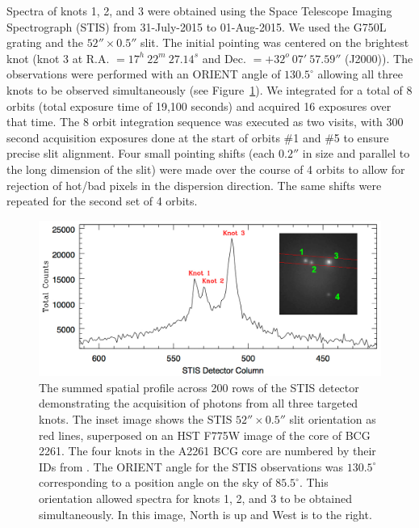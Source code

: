 \documentclass[useAMS,usenatbib]{emulateapj}
\newcommand{\src}{BCG\,2261}
\begin{document}
Spectra of knots 1, 2, and 3 were obtained using the Space Telescope Imaging Spectrograph (STIS) from 31-July-2015 to 01-Aug-2015. We used the G750L grating and the $52'' \times 0.5''$ slit. The initial pointing was centered on the brightest knot (knot 3 at R.A. $=17^h\ 22^m\ 27.14^s$ and Dec. $=+32^o\ 07'\ 57.59''$ (J2000)). The observations were performed with an ORIENT angle of $130.5^{\circ}$ allowing all three knots to be observed simultaneously (see Figure~\ref{stis_orient}). We integrated for a total of 8 orbits (total exposure time of 19,100 seconds) and acquired 16 exposures over that time. The 8 orbit integration sequence was executed as two visits, with 300 second acquisition exposures done at the start of orbits \#1 and \#5 to ensure precise slit alignment. Four small pointing shifts (each $0.2''$ in size and parallel to the long dimension of the slit) were made over the course of 4 orbits to allow for rejection of hot/bad pixels in the dispersion direction. The same shifts were repeated for the second set of 4 orbits. 

\begin{figure}[!t]
\begin{center}
\includegraphics[width=1.0\columnwidth]{figs/compact_STIS_slit_geometry_with_profile.jpg}
\end{center}
\caption{The summed spatial profile across 200 rows of the STIS detector demonstrating the acquisition of photons from all three targeted knots. The inset image shows the STIS $52'' \times 0.5''$ slit orientation as red lines, superposed on an HST F775W image of the core of \src. The four knots in the A2261 BCG core are numbered by their IDs from \cite{postman12}. The ORIENT angle for the STIS observations was $130.5^{\circ}$ corresponding to a position angle on the sky of  $85.5^{\circ}$. This orientation allowed spectra for knots 1, 2, and 3 to be obtained simultaneously. In this image, North is up and West is to the right.}
\label{stis_orient}
\vspace{1mm}
\end{figure}
\end{document}
